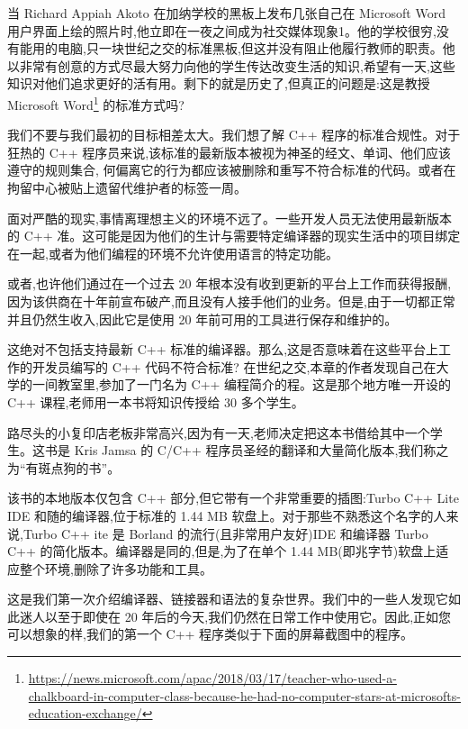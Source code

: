 当 Richard Appiah Akoto 在加纳学校的黑板上发布几张自己在 Microsoft Word 用户界面上绘的照片时,他立即在一夜之间成为社交媒体现象1。他的学校很穷,没有能用的电脑,只一块世纪之交的标准黑板,但这并没有阻止他履行教师的职责。他以非常有创意的方式尽最大努力向他的学生传达改变生活的知识,希望有一天,这些知识对他们追求更好的活有用。剩下的就是历史了,但真正的问题是:这是教授 Microsoft Word\footnote{\url{https://news.microsoft.com/apac/2018/03/17/teacher-who-used-a-chalkboard-in-computer-class-because-he-had-no-computer-stars-at-microsofts-education-exchange/}} 的标准方式吗?

我们不要与我们最初的目标相差太大。我们想了解 C++ 程序的标准合规性。对于狂热的 C++ 程序员来说,该标准的最新版本被视为神圣的经文、单词、他们应该遵守的规则集合, 何偏离它的行为都应该被删除和重写不符合标准的代码。或者在拘留中心被贴上遗留代维护者的标签一周。

面对严酷的现实,事情离理想主义的环境不远了。一些开发人员无法使用最新版本的 C++ 准。这可能是因为他们的生计与需要特定编译器的现实生活中的项目绑定在一起,或者为他们编程的环境不允许使用语言的特定功能。

或者,也许他们通过在一个过去 20 年根本没有收到更新的平台上工作而获得报酬,因为该供商在十年前宣布破产,而且没有人接手他们的业务。但是,由于一切都正常并且仍然生收入,因此它是使用 20 年前可用的工具进行保存和维护的。

这绝对不包括支持最新 C++ 标准的编译器。那么,这是否意味着在这些平台上工作的开发员编写的 C++ 代码不符合标准? 在世纪之交,本章的作者发现自己在大学的一间教室里,参加了一门名为 C++ 编程简介的程。这是那个地方唯一开设的 C++ 课程,老师用一本书将知识传授给 30 多个学生。

路尽头的小复印店老板非常高兴,因为有一天,老师决定把这本书借给其中一个学生。这书是 Kris Jamsa 的 C/C++ 程序员圣经的翻译和大量简化版本,我们称之为“有斑点狗的书”。

该书的本地版本仅包含 C++ 部分,但它带有一个非常重要的插图:Turbo C++ Lite IDE 和随的编译器,位于标准的 1.44 MB 软盘上。对于那些不熟悉这个名字的人来说,Turbo C++ ite 是 Borland 的流行(且非常用户友好)IDE 和编译器 Turbo C++ 的简化版本。编译器是同的,但是,为了在单个 1.44 MB(即兆字节)软盘上适应整个环境,删除了许多功能和工具。

这是我们第一次介绍编译器、链接器和语法的复杂世界。我们中的一些人发现它如此迷人以至于即使在 20 年后的今天,我们仍然在日常工作中使用它。因此,正如您可以想象的样,我们的第一个 C++ 程序类似于下面的屏幕截图中的程序。


